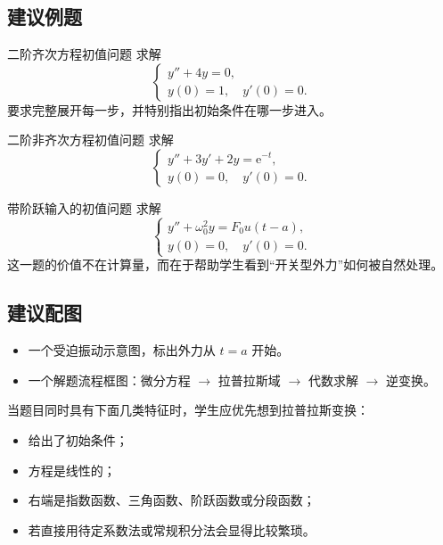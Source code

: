 \subsection*{建议例题}
\begin{lizi}{二阶齐次方程初值问题}{}
求解
\[
    \begin{cases}
        y''+4y=0,\\
        y(0)=1,\quad y'(0)=0.
    \end{cases}
\]
要求完整展开每一步，并特别指出初始条件在哪一步进入。
\end{lizi}

\begin{lizi}{二阶非齐次方程初值问题}{}
求解
\[
    \begin{cases}
        y''+3y'+2y=\mathrm{e}^{-t},\\
        y(0)=0,\quad y'(0)=0.
    \end{cases}
\]
\end{lizi}

\begin{lizi}{带阶跃输入的初值问题}{}
求解
\[
    \begin{cases}
        y''+\omega_0^2y=F_0u(t-a),\\
        y(0)=0,\quad y'(0)=0.
    \end{cases}
\]
这一题的价值不在计算量，而在于帮助学生看到``开关型外力''如何被自然处理。
\end{lizi}

\subsection*{建议配图}
\begin{itemize}
    \item 一个受迫振动示意图，标出外力从 $t=a$ 开始。
    \item 一个解题流程框图：微分方程 $\to$ 拉普拉斯域 $\to$ 代数求解 $\to$ 逆变换。
\end{itemize}

\begin{tishi}[本节应强化的判断思路]
当题目同时具有下面几类特征时，学生应优先想到拉普拉斯变换：
\begin{itemize}
    \item 给出了初始条件；
    \item 方程是线性的；
    \item 右端是指数函数、三角函数、阶跃函数或分段函数；
    \item 若直接用待定系数法或常规积分法会显得比较繁琐。
\end{itemize}
\end{tishi}


